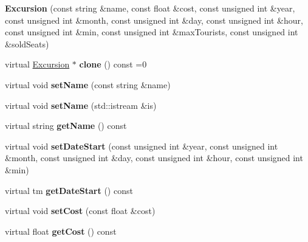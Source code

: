 \begin{DoxyCompactItemize}
\item 
\hypertarget{class_excursion_a2a3a954d1938a78121ae94c85edc5252}{}{\bfseries Excursion} (const string \&name, const float \&cost, const unsigned int \&year, const unsigned int \&month, const unsigned int \&day, const unsigned int \&hour, const unsigned int \&min, const unsigned int \&max\+Tourists, const unsigned int \&sold\+Seats)\label{class_excursion_a2a3a954d1938a78121ae94c85edc5252}

\item 
\hypertarget{class_excursion_ad4eea52ed5b6a747139aedf0dce40e90}{}virtual \hyperlink{class_excursion}{Excursion} $\ast$ {\bfseries clone} () const =0\label{class_excursion_ad4eea52ed5b6a747139aedf0dce40e90}

\item 
\hypertarget{class_excursion_af9730feecd3c87c84db1ca87b91a9b5a}{}virtual void {\bfseries set\+Name} (const string \&name)\label{class_excursion_af9730feecd3c87c84db1ca87b91a9b5a}

\item 
\hypertarget{class_excursion_a14001909d85d73f4d28009343d387da2}{}virtual void {\bfseries set\+Name} (std\+::istream \&is)\label{class_excursion_a14001909d85d73f4d28009343d387da2}

\item 
\hypertarget{class_excursion_aa7593c43269c8a201f2d9600c9f6a883}{}virtual string {\bfseries get\+Name} () const \label{class_excursion_aa7593c43269c8a201f2d9600c9f6a883}

\item 
\hypertarget{class_excursion_acdab32c88cd3f338508fa8f301de5c43}{}virtual void {\bfseries set\+Date\+Start} (const unsigned int \&year, const unsigned int \&month, const unsigned int \&day, const unsigned int \&hour, const unsigned int \&min)\label{class_excursion_acdab32c88cd3f338508fa8f301de5c43}

\item 
\hypertarget{class_excursion_a2145b43efb2dadd105d15e59fa462190}{}virtual tm {\bfseries get\+Date\+Start} () const \label{class_excursion_a2145b43efb2dadd105d15e59fa462190}

\item 
\hypertarget{class_excursion_a844bd4f17be0f232464c8da55106304c}{}virtual void {\bfseries set\+Cost} (const float \&cost)\label{class_excursion_a844bd4f17be0f232464c8da55106304c}

\item 
\hypertarget{class_excursion_ae6d87d9e36db67922f56c6a89ef1ee92}{}virtual float {\bfseries get\+Cost} () const \label{class_excursion_ae6d87d9e36db67922f56c6a89ef1ee92}


\end{DoxyCompactItemize}
